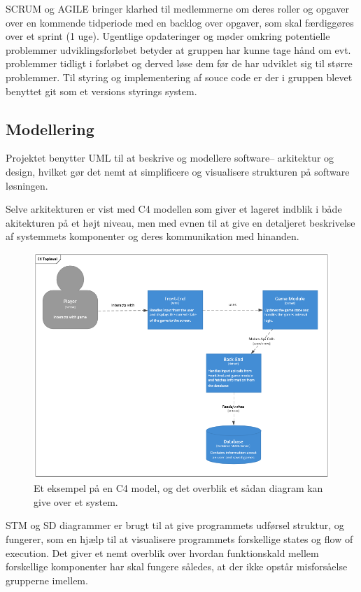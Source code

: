 SCRUM og AGILE bringer klarhed til medlemmerne om deres roller og opgaver over en 
kommende tidperiode med en backlog over opgaver, som skal færdiggøres over et sprint (1 uge).
Ugentlige opdateringer og møder omkring potentielle problemmer udviklingsforløbet betyder
at gruppen har kunne tage hånd om evt. problemmer tidligt i forløbet og derved løse dem
før de har udviklet sig til større problemmer.
Til styring og implementering af souce code er der i gruppen blevet benyttet git som et versions styrings system.

\subsection{Modellering}
Projektet benytter UML til at beskrive og modellere software-- arkitektur
og design, hvilket gør det nemt at simplificere og visualisere strukturen på software
løsningen. 

Selve arkitekturen er vist med C4 modellen som giver et lageret indblik i både
akitekturen på et højt niveau, men med evnen til at give en detaljeret beskrivelse
af systemmets komponenter og deres kommunikation med hinanden.

\begin{figure}[H]
  \centering
  \includegraphics[scale=0.8]{02-Body/Images/C4TopLvlDB.PNG}
  \caption{Et eksempel på en C4 model, og det overblik et sådan diagram kan give over et system.}
  \label{fig:c4}
\end{figure}

STM og SD diagrammer er brugt til at give programmets udførsel struktur, og fungerer,
som en hjælp til at visualisere programmets forskellige states og flow of execution.
Det giver et nemt overblik over hvordan funktionskald mellem forskellige komponenter
har skal fungere således, at der ikke opstår misforsåelse grupperne imellem. 

